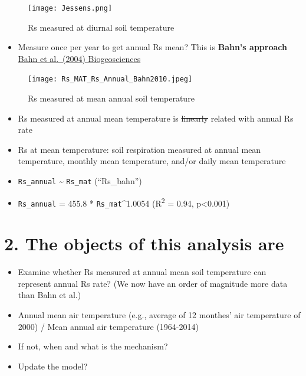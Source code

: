 \documentclass[]{article}
\providecommand{\tightlist}{%
  \setlength{\itemsep}{0pt}\setlength{\parskip}{0pt}}
\begin{document}
\begin{figure}
\centering
\texttt{[image: Jessens.png]}
\caption{Rs measured at diurnal soil temperature}
\end{figure}

\begin{itemize}
\tightlist
\item
  Measure once per year to get annual Rs mean? This is \textbf{Bahn's
  approach} \href{http://dx.doi.org/10.5194/bg-7-2147-2010}{Bahn et
  al.~(2004) Biogeosciences}
\end{itemize}

\begin{figure}
\centering
\texttt{[image: Rs\_MAT\_Rs\_Annual\_Bahn2010.jpeg]}
\caption{Rs measured at mean annual soil temperature}
\end{figure}

\begin{itemize}
\tightlist
\item
  Rs measured at annual mean temperature is \sout{linearly} related with
  annual Rs rate
\item
  Rs at mean temperature: soil respiration measured at annual mean
  temperature, monthly mean temperature, and/or daily mean temperature
\item
  \texttt{Rs\_annual} \textasciitilde{} \texttt{Rs\_mat} (``Rs\_bahn'')
\item
  \texttt{Rs\_annual} = 455.8 * \texttt{Rs\_mat}\^{}1.0054
  (R\textsuperscript{2} = 0.94, p\textless0.001)
\end{itemize}

\hypertarget{the-objects-of-this-analysis-are}{%
\section{2. The objects of this analysis
are}\label{the-objects-of-this-analysis-are}}

\begin{itemize}
\tightlist
\item
  Examine whether Rs measured at annual mean soil temperature can
  represent annual Rs rate? (We now have an order of magnitude more data
  than Bahn et al.)
\item
  Annual mean air temperature (e.g., average of 12 monthes' air
  temperature of 2000) / Mean annual air temperature (1964-2014)
\item
  If not, when and what is the mechanism?
\item
  Update the model?
\end{itemize}
\end{document}
